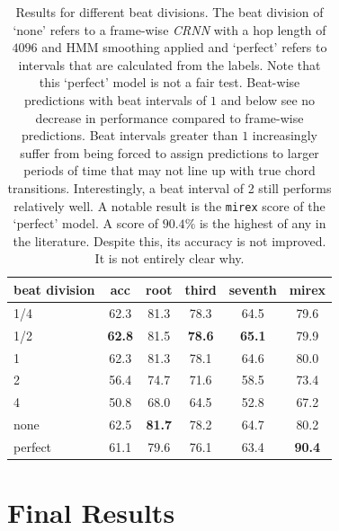\begin{table}[H]
    \centering
    \begin{tabular}{lccccc}
        \toprule
        beat division & acc & root & third & seventh & mirex \\  
        \midrule
        1/4                 & 62.3           & 81.3          & 78.3          & 64.5           & 79.6         \\
        1/2                 & \textbf{62.8}  & 81.5          & \textbf{78.6} & \textbf{65.1}  & 79.9         \\
        1                   & 62.3           & 81.3          & 78.1          & 64.6           & 80.0         \\
        2  & 56.4           & 74.7          & 71.6          & 58.5           & 73.4         \\
        4 & 50.8           & 68.0          & 64.5          & 52.8           & 67.2         \\
        none                & 62.5           & \textbf{81.7} & 78.2          & 64.7           & 80.2         \\
        perfect             & 61.1           & 79.6          & 76.1          & 63.4           & \textbf{90.4}\\
        \bottomrule
    \end{tabular}
    \caption{Results for different beat divisions. The beat division of `none' refers to a frame-wise \emph{CRNN} with a hop length of $4096$ and HMM smoothing applied and `perfect' refers to intervals that are calculated from the labels. Note that this `perfect' model is not a fair test. Beat-wise predictions with beat intervals of $1$ and below see no decrease in performance compared to frame-wise predictions. Beat intervals greater than $1$ increasingly suffer from being forced to assign predictions to larger periods of time that may not line up with true chord transitions. Interestingly, a beat interval of 2 still performs relatively well. A notable result is the \texttt{mirex} score of the `perfect' model. A score of $90.4\%$ is the highest of any in the literature. Despite this, its accuracy is not improved. It is not entirely clear why. }\label{tab:beat_division}
\end{table}


\section{Final Results}\label{sec:test-set}

